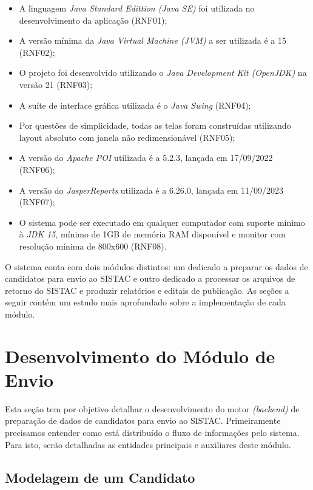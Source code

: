 \documentclass[
	12pt,			%
	openright,		%
	oneside,	
	a4paper,		%
	english,		%
	brazil			%
]{abntex2/abntex2}  %
\begin{document}
	\begin{itemize}
		
		\item A linguagem \textit{Java Standard Edittion (Java SE)} foi utilizada no desenvolvimento da aplicação (RNF01);
		\item A versão mínima da \textit{Java Virtual Machine (JVM)} a ser utilizada é a 15 (RNF02);
		\item O projeto foi desenvolvido utilizando o \textit{Java Development Kit (OpenJDK)} na versão 21 (RNF03);
		\item A suíte de interface gráfica utilizada é o \textit{Java Swing} (RNF04);
		\item Por questões de simplicidade, todas as telas foram construídas utilizando layout absoluto com janela não redimensionável (RNF05);
		\item A versão do \textit{Apache POI} utilizada é a 5.2.3, lançada em 17/09/2022 (RNF06);
		\item A versão do \textit{JasperReports\textregistered} utilizada é a 6.26.0, lançada em 11/09/2023 (RNF07);
		\item O sistema pode ser executado em qualquer computador com suporte mínimo à \textit{JDK 15}, mínimo de 1GB de memória RAM disponível e monitor com resolução mínima de 800x600 (RNF08).
		
	\end{itemize}
	
	O sistema conta com dois módulos distintos: um dedicado a preparar os dados de candidatos para envio ao SISTAC e outro dedicado a processar os arquivos de retorno do SISTAC e produzir relatórios e editais de publicação. As seções a seguir contém um estudo mais aprofundado sobre a implementação de cada módulo.

	\section{Desenvolvimento do Módulo de Envio}
	
	Esta seção tem por objetivo detalhar o desenvolvimento do motor \textit{(backend)} de preparação de dados de candidatos para envio ao SISTAC. Primeiramente precisamos entender como está distribuído o fluxo de informações pelo sistema. Para isto, serão detalhadas as entidades principais e auxiliares deste módulo.
	
	\subsection{Modelagem de um Candidato} \label{candidato}
	
\end{document}

